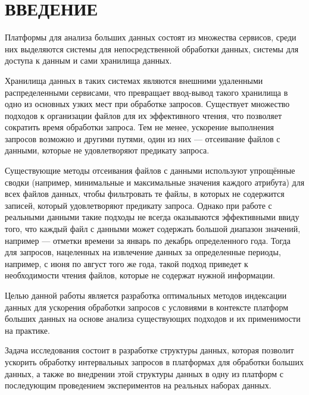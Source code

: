 \section*{ВВЕДЕНИЕ}

Платформы для анализа больших данных состоят из множества сервисов, среди них  выделяются системы для непосредственной обработки данных, системы для доступа к данным и сами хранилища данных.

Хранилища данных в таких системах являются внешними удаленными распределенными сервисами, что превращает ввод-вывод такого хранилища в одно из основных узких мест при обработке запросов. Существует множество подходов к организации файлов для их эффективного чтения, что позволяет сократить время  обработки запроса. Тем не менее, ускорение выполнения запросов возможно и другими путями, один из них --- отсеивание файлов с данными, которые не удовлетворяют предикату запроса.

Существующие методы отсеивания файлов с данными используют упрощённые сводки (например, минимальные и максимальные значения каждого атрибута) для всех файлов данных, чтобы фильтровать те файлы, в которых не содержится записей, который удовлетворяют предикату запроса. Однако при работе с реальными данными такие подходы не всегда оказываются эффективными ввиду того, что каждый файл с данными может содержать большой диапазон значений, например --- отметки времени за январь по декабрь определенного года. Тогда для запросов, нацеленных на извлечение данных за определенные периоды, например, с июня по август того же года, такой подход приведет к необходимости чтения файлов, которые не содержат нужной информации.

Целью данной работы является разработка оптимальных методов индексации данных для ускорения обработки запросов с условиями в контексте платформ больших данных на основе анализа существующих подходов и их применимости на практике.

Задача исследования состоит в разработке структуры данных, которая позволит ускорить обработку интервальных запросов в платформах для обработки больших данных, а также во внедрении этой структуры данных в одну из платформ с последующим проведением экспериментов на реальных наборах данных.
